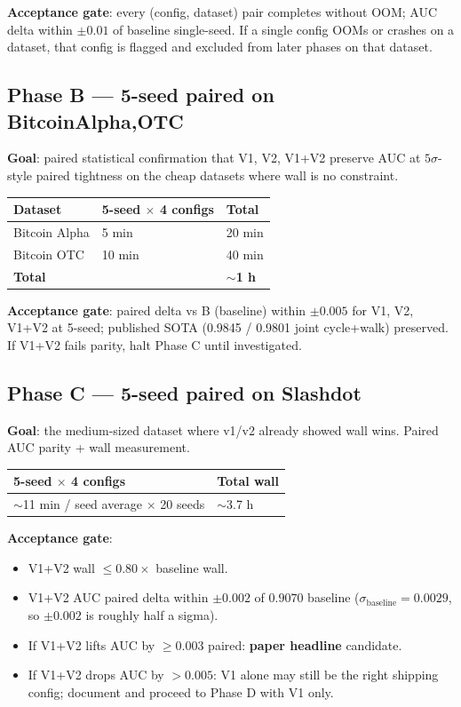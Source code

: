 \documentclass[11pt,a4paper]{article}
\begin{document}
\textbf{Acceptance gate}: every (config, dataset) pair completes
without OOM; AUC delta within $\pm 0.01$ of baseline single-seed.
If a single config OOMs or crashes on a dataset, that config is
flagged and excluded from later phases on that dataset.

\subsection*{Phase B --- 5-seed paired on Bitcoin{Alpha,OTC}}
\textbf{Goal}: paired statistical confirmation that V1, V2, V1+V2
preserve AUC at $5\sigma$-style paired tightness on the cheap
datasets where wall is no constraint.

\begin{tabular}{lll}
\toprule
Dataset & 5-seed $\times$ 4 configs & Total \\
\midrule
Bitcoin Alpha & 5 min & 20 min \\
Bitcoin OTC   & 10 min & 40 min \\
\midrule
\textbf{Total} & & $\sim$\textbf{1 h} \\
\bottomrule
\end{tabular}

\textbf{Acceptance gate}: paired delta vs B (baseline) within
$\pm 0.005$ for V1, V2, V1+V2 at 5-seed; published SOTA (0.9845 /
0.9801 joint cycle+walk) preserved.  If V1+V2 fails parity, halt
Phase C until investigated.

\subsection*{Phase C --- 5-seed paired on Slashdot}
\textbf{Goal}: the medium-sized dataset where v1/v2 already showed
wall wins.  Paired AUC parity + wall measurement.

\begin{tabular}{ll}
\toprule
5-seed $\times$ 4 configs & Total wall \\
\midrule
$\sim$11 min / seed average $\times$ 20 seeds & $\sim$3.7 h \\
\bottomrule
\end{tabular}

\textbf{Acceptance gate}:
\begin{itemize}
\item V1+V2 wall $\le 0.80 \times$ baseline wall.
\item V1+V2 AUC paired delta within $\pm 0.002$ of $0.9070$ baseline
  ($\sigma_{\text{baseline}} = 0.0029$, so $\pm 0.002$ is roughly
  half a sigma).
\item If V1+V2 lifts AUC by $\ge 0.003$ paired: \textbf{paper
  headline} candidate.
\item If V1+V2 drops AUC by $> 0.005$: V1 alone may still be the
  right shipping config; document and proceed to Phase D with V1
  only.
\end{itemize}
\end{document}

